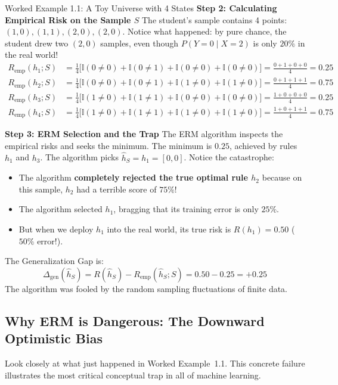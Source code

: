 \begin{examplebox}{Worked Example 1.1: A Toy Universe with 4 States}
\textbf{Step 2: Calculating Empirical Risk on the Sample $S$}
The student's sample contains 4 points: $(1, 0), (1, 1), (2, 0), (2, 0)$. Notice what happened: by pure chance, the student drew two $(2, 0)$ samples, even though $P(Y=0 \mid X=2)$ is only $20\%$ in the real world!
\begin{align*}
R_{\text{emp}}(h_1; S) &= \frac{1}{4} \big[ \mathbb{I}(0 \ne 0) + \mathbb{I}(0 \ne 1) + \mathbb{I}(0 \ne 0) + \mathbb{I}(0 \ne 0) \big] = \frac{0 + 1 + 0 + 0}{4} = \mathbf{0.25} \\
R_{\text{emp}}(h_2; S) &= \frac{1}{4} \big[ \mathbb{I}(0 \ne 0) + \mathbb{I}(0 \ne 1) + \mathbb{I}(1 \ne 0) + \mathbb{I}(1 \ne 0) \big] = \frac{0 + 1 + 1 + 1}{4} = \mathbf{0.75} \\
R_{\text{emp}}(h_3; S) &= \frac{1}{4} \big[ \mathbb{I}(1 \ne 0) + \mathbb{I}(1 \ne 1) + \mathbb{I}(0 \ne 0) + \mathbb{I}(0 \ne 0) \big] = \frac{1 + 0 + 0 + 0}{4} = \mathbf{0.25} \\
R_{\text{emp}}(h_4; S) &= \frac{1}{4} \big[ \mathbb{I}(1 \ne 0) + \mathbb{I}(1 \ne 1) + \mathbb{I}(1 \ne 0) + \mathbb{I}(1 \ne 0) \big] = \frac{1 + 0 + 1 + 1}{4} = \mathbf{0.75}
\end{align*}

\textbf{Step 3: ERM Selection and the Trap}
The ERM algorithm inspects the empirical risks and seeks the minimum. The minimum is $0.25$, achieved by rules $h_1$ and $h_3$.
The algorithm picks $\hat{h}_S = h_1 = [0, 0]$.
Notice the catastrophe:
\begin{itemize}
    \item The algorithm \textbf{completely rejected the true optimal rule $h_2$} because on this sample, $h_2$ had a terrible score of $75\%$!
    \item The algorithm selected $h_1$, bragging that its training error is only $25\%$.
    \item But when we deploy $h_1$ into the real world, its true risk is $R(h_1) = 0.50$ ($50\%$ error!).
\end{itemize}
The Generalization Gap is:
\begin{equation*}
\Delta_{\text{gen}}(\hat{h}_S) = R(\hat{h}_S) - R_{\text{emp}}(\hat{h}_S; S) = 0.50 - 0.25 = \mathbf{+0.25}
\end{equation*}
The algorithm was fooled by the random sampling fluctuations of finite data.
\end{examplebox}

\subsection{Why ERM is Dangerous: The Downward Optimistic Bias}
Look closely at what just happened in Worked Example~1.1. This concrete failure illustrates the most critical conceptual trap in all of machine learning.

